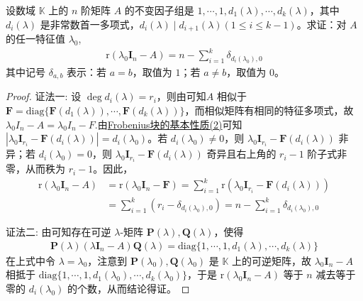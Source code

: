 \documentclass[../../main.tex]{subfiles}%
\begin{document}
\begin{proposition}\label{proposition:特征值对应的特征矩阵的秩与不变因子组的关系}
设数域 $\mathbb{K}$ 上的 $n$ 阶矩阵 $A$ 的不变因子组是 $1,\cdots,1,d_1(\lambda),\cdots,d_k(\lambda)$，其中 $d_i(\lambda)$ 是非常数首一多项式，$d_i(\lambda)\mid d_{i + 1}(\lambda) (1\leqslant  i\leqslant  k - 1)$。求证：对 $A$ 的任一特征值 $\lambda_0$,
\begin{align*}
\mathrm{r}(\lambda_0\boldsymbol{I}_n - A)=n - \sum_{i = 1}^{k}\delta_{d_i(\lambda_0),0}
\end{align*}
其中记号 $\delta_{a,b}$ 表示：若 $a = b$，取值为 $1$；若 $a\neq b$，取值为 $0$。
\end{proposition}
\begin{proof}

{\color{blue}证法一:}
设 $\deg d_i(\lambda)=r_i$，则由可知$A$ 相似于 $\boldsymbol{F}=\mathrm{diag}\{\boldsymbol{F}(d_1(\lambda)),\cdots,\boldsymbol{F}(d_k(\lambda))\}$，而相似矩阵有相同的特征多项式，故$\lambda_0I_n-A=\lambda_0I_n-F$.由\hyperref[lemma:Frobenius标准型矩阵的极小多项式和不变因子]{Frobenius块的基本性质(2)}可知$|\lambda_0\boldsymbol{I}_{r_i}-\boldsymbol{F}(d_i(\lambda))|=d_i(\lambda_0)$。若 $d_i(\lambda_0)\neq 0$，则 $\lambda_0\boldsymbol{I}_{r_i}-\boldsymbol{F}(d_i(\lambda))$ 非异；若 $d_i(\lambda_0)=0$，则 $\lambda_0\boldsymbol{I}_{r_i}-\boldsymbol{F}(d_i(\lambda))$ 奇异且右上角的 $r_i - 1$ 阶子式非零，从而秩为 $r_i - 1$。因此，
\begin{align*}
\mathrm{r}(\lambda_0\boldsymbol{I}_n - A)&=\mathrm{r}(\lambda_0\boldsymbol{I}_n - \boldsymbol{F})=\sum_{i = 1}^{k}\mathrm{r}(\lambda_0\boldsymbol{I}_{r_i}-\boldsymbol{F}(d_i(\lambda)))\\
&=\sum_{i = 1}^{k}(r_i - \delta_{d_i(\lambda_0),0})=n - \sum_{i = 1}^{k}\delta_{d_i(\lambda_0),0}
\end{align*}

{\color{blue}证法二:}
由可知存在可逆 $\lambda$-矩阵 $\boldsymbol{P}(\lambda),\boldsymbol{Q}(\lambda)$，使得
\begin{align*}
\boldsymbol{P}(\lambda)(\lambda\boldsymbol{I}_n - A)\boldsymbol{Q}(\lambda)=\mathrm{diag}\{1,\cdots,1,d_1(\lambda),\cdots,d_k(\lambda)\}
\end{align*}
在上式中令 $\lambda = \lambda_0$，注意到 $\boldsymbol{P}(\lambda_0),\boldsymbol{Q}(\lambda_0)$ 是 $\mathbb{K}$ 上的可逆矩阵，故 $\lambda_0\boldsymbol{I}_n - A$ 相抵于 $\mathrm{diag}\{1,\cdots,1,d_1(\lambda_0),\cdots,d_k(\lambda_0)\}$，于是 $\mathrm{r}(\lambda_0\boldsymbol{I}_n - A)$ 等于 $n$ 减去等于零的 $d_i(\lambda_0)$ 的个数，从而结论得证。
\end{proof}
\end{document}
